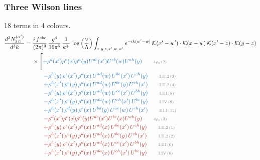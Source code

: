 \documentclass[10pt]{article}
\begin{document}
\subsubsection{Three Wilson lines}
18 terms in 4 colours.
\begin{align}
\frac{d^{3}N^{(\alpha')}_{3\,U}}{d^{3}k}={}&\frac{i\,f^{abc}}{(2\pi)^{3}}\,\frac{g^{4}}{16\pi^{5}}\,\frac{1}{k^{+}}\,\log\Big(\frac{\vee}{\Lambda}\Big)\int_{x,y,z,x',w,w'}e^{-ik(w'-w)}\,\mathcal{K}(x'-w')\cdot\mathcal{K}(x-w)\,\mathcal{K}(x'-z)\cdot\mathcal{K}(y-z)\notag\\
&\times\Bigg[{\color{RoyalBlue}+\rho^{d}(x') \rho^{e}(x) \rho^{h}(y) U^{d c}(x') U^{e b}(w) U^{a h}(y)}\tag*{\color{gray}\scriptsize $4\rho_b$\,(2)}\\
&\qquad{\color{RoyalBlue}-\rho^{h}(y)\,\rho^{e}(x')\,\rho^{d}(x)\,U^{ad}(w)\,U^{be}(x')\,U^{ch}(y)}\tag*{\color{gray}\scriptsize I.II.2\,(3)}\\
&\qquad{\color{RoyalBlue}+\rho^{h}(x')\,\rho^{e}(y)\,\rho^{d}(x)\,U^{ad}(w)\,U^{be}(y)\,U^{ch}(x')}\tag*{\color{gray}\scriptsize I.II.2\,(4)}\\
&\qquad{\color{RoyalBlue}-\rho^{h}(y)\,\rho^{e}(x')\,\rho^{d}(x)\,U^{ad}(w)\,U^{ce}(x')\,U^{bh}(y)}\tag*{\color{gray}\scriptsize I.III\,(8)}\\
&\qquad{\color{RoyalBlue}-\rho^{h}(x')\,\rho^{e}(y)\,\rho^{d}(x)\,U^{da}(w)\,U^{ch}(x')\,U^{be}(y)}\tag*{\color{gray}\scriptsize I.IV\,(8)}\\
&\qquad{\color{RoyalBlue}+\rho^{h}(x')\,\rho^{d}(y)\,\rho^{e}(x)\,U^{bd}(y)\,U^{ae}(w)\,U^{ch}(x')}\tag*{\color{gray}\scriptsize III.I\,(12)}\\
&\qquad{\color{BrickRed}-\rho^{d}(x') \rho^{e}(x) \rho^{h}(y) U^{d c}(x') U^{b e}(x) U^{a h}(y)}\tag*{\color{gray}\scriptsize $4\rho_b$\,(3)}\\
&\qquad{\color{BrickRed}+\rho^{h}(y)\,\rho^{e}(x')\,\rho^{d}(x)\,U^{ad}(x)\,U^{be}(x')\,U^{ch}(y)}\tag*{\color{gray}\scriptsize I.II.2\,(1)}\\
&\qquad{\color{BrickRed}-\rho^{h}(x')\,\rho^{e}(y)\,\rho^{d}(x)\,U^{ad}(x)\,U^{be}(y)\,U^{ch}(x')}\tag*{\color{gray}\scriptsize I.II.2\,(2)}\\
&\qquad{\color{BrickRed}+\rho^{h}(y)\,\rho^{e}(x')\,\rho^{d}(x)\,U^{ad}(x)\,U^{ce}(x')\,U^{bh}(y)}\tag*{\color{gray}\scriptsize I.III\,(6)}\\
&\qquad{\color{BrickRed}+\rho^{h}(x')\,\rho^{e}(y)\,\rho^{d}(x)\,U^{da}(x)\,U^{ch}(x')\,U^{be}(y)}\tag*{\color{gray}\scriptsize I.IV\,(6)}\\

\end{align}
\end{document}
